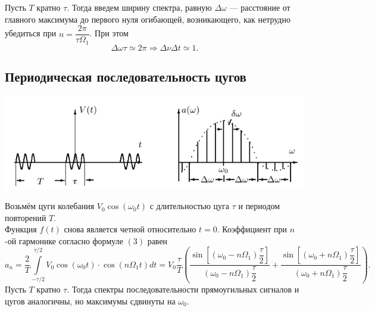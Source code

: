 Пусть $T$ кратно $\tau$. Тогда введем ширину спектра, равную $\Delta \omega$ --- расстояние от главного максимума до первого нуля огибающей, возникающего, как нетрудно убедиться при $n = \dfrac{2\pi}{\tau \Omega_1}$. При 
этом
    \begin{equation}
    \Delta \omega \tau \simeq 2\pi \Rightarrow \Delta \nu \Delta t \simeq 1.
    \end{equation}
\subsection*{Периодическая последовательность цугов}
    \begin{center}
    \includegraphics[scale=0.9]{images/3.png}
    \end{center}
Возьмём цуги колебания $V_0 \cos(\omega_0 t)$ с длительностью цуга $\tau$ и периодом повторений $T$.\\
Функция $f(t)$ снова является четной относительно $t = 0$. Коэффициент при $n$-ой гармонике согласно формуле $(3)$ равен
    \begin{equation}
    a_n = \dfrac{2}{T}\int\limits_{-\tau/2}^{\tau/2}V_0 \cos \left(\omega_0t\right) \cdot \cos\left(n \Omega_1t\right)dt = V_0 \dfrac{\tau}{T}\left( \dfrac{\sin\left[\left(\omega_0 - n \Omega_1\right)\dfrac{\tau}{2}\right]}{\left( \omega_0 - n \Omega_1\right) \dfrac{\tau}{2}} + \dfrac{\sin\left[\left(\omega_0 + n \Omega_1\right)\dfrac{\tau}{2}\right]}{\left( \omega_0 + n \Omega_1\right) \dfrac{\tau}{2}}\right).
    \end{equation}
Пусть $T$ кратно $\tau$. Тогда спектры последовательности прямоугильных сигналов и цугов аналогичны, но максимумы сдвинуты на $\omega_0$.
